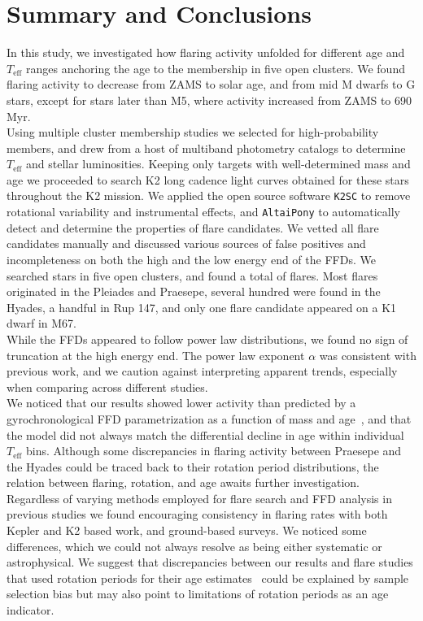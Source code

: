 \documentclass{aa}
\begin{document}
\section{Summary and Conclusions}
\label{sec:summary}
In this study, we investigated how flaring activity unfolded for different age and $T_\mathrm{eff}$ ranges anchoring the age to the membership in five open clusters. We found flaring activity to decrease from ZAMS to solar age, and from mid M dwarfs to G stars, except for stars later than M5, where activity increased from ZAMS to 690\,Myr.
\\
Using multiple cluster membership studies we selected for high-probability members, and drew from a host of multiband photometry catalogs to determine $T_\mathrm{eff}$ and stellar luminosities. Keeping only targets with well-determined mass and age we proceeded to search K2 long cadence light curves obtained for these stars throughout the K2 mission. We applied the open source software \texttt{K2SC} to remove rotational variability and instrumental effects, and \texttt{AltaiPony} to automatically detect and determine the properties of flare candidates. We vetted all flare candidates manually and discussed various sources of false positives and incompleteness on both the high and the low energy end of the FFDs. We searched stars in five open clusters, and found a total of flares. Most flares originated in the Pleiades and Praesepe, several hundred were found in the Hyades, a handful in Rup 147, and only one flare candidate appeared on a K1 dwarf in M67.
\\
While the FFDs appeared to follow power law distributions, we found no sign of truncation at the high energy end. The power law exponent $\alpha$ was consistent with previous work, and we caution against interpreting apparent trends, especially when comparing across different studies.
\\
We noticed that our results showed lower activity than predicted by a gyrochronological FFD parametrization as a function of mass and age~\citep{davenport2019}, and that the model did not always match the differential decline in age within individual $T_\mathrm{eff}$ bins. Although some discrepancies in flaring activity between Praesepe and the Hyades could be traced back to their rotation period distributions, the relation between flaring, rotation, and age awaits further investigation.
\\
Regardless of varying methods employed for flare search and FFD analysis in previous studies we found encouraging consistency in flaring rates with both Kepler and K2 based work, and ground-based surveys. We noticed some differences, which we could not always resolve as being either systematic or astrophysical. We suggest that discrepancies between our results and flare studies that used rotation periods for their age estimates~\citep{davenport2019, raetz2020} could be explained by sample selection bias but may also point to limitations of rotation periods as an age indicator.
\end{document}
